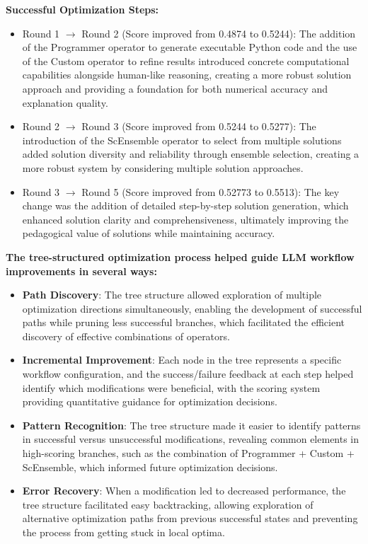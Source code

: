 \textbf{Successful Optimization Steps:}
\begin{itemize}[leftmargin=20pt]
    \item Round 1 $\rightarrow$ Round 2 (Score improved from 0.4874 to 0.5244): The addition of the Programmer operator to generate executable Python code and the use of the Custom operator to refine results introduced concrete computational capabilities alongside human-like reasoning, creating a more robust solution approach and providing a foundation for both numerical accuracy and explanation quality.
    
    \item Round 2 $\rightarrow$ Round 3 (Score improved from 0.5244 to 0.5277): The introduction of the ScEnsemble operator to select from multiple solutions added solution diversity and reliability through ensemble selection, creating a more robust system by considering multiple solution approaches.
    
    \item Round 3 $\rightarrow$ Round 5 (Score improved from 0.52773 to 0.5513): The key change was the addition of detailed step-by-step solution generation, which enhanced solution clarity and comprehensiveness, ultimately improving the pedagogical value of solutions while maintaining accuracy.
\end{itemize}

\textbf{The tree-structured optimization process helped guide LLM workflow improvements in several ways:}
\begin{itemize}[leftmargin=20pt]
    \item \textbf{Path Discovery}: The tree structure allowed exploration of multiple optimization directions simultaneously, enabling the development of successful paths while pruning less successful branches, which facilitated the efficient discovery of effective combinations of operators.
    
    \item \textbf{Incremental Improvement}: Each node in the tree represents a specific workflow configuration, and the success/failure feedback at each step helped identify which modifications were beneficial, with the scoring system providing quantitative guidance for optimization decisions.
    
    \item \textbf{Pattern Recognition}: The tree structure made it easier to identify patterns in successful versus unsuccessful modifications, revealing common elements in high-scoring branches, such as the combination of Programmer + Custom + ScEnsemble, which informed future optimization decisions.
    
    \item \textbf{Error Recovery}: When a modification led to decreased performance, the tree structure facilitated easy backtracking, allowing exploration of alternative optimization paths from previous successful states and preventing the process from getting stuck in local optima.
\end{itemize}

